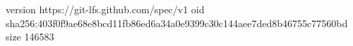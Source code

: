 version https://git-lfs.github.com/spec/v1
oid sha256:403f0f9ae68e8bcd11fb86ed6a34a0e9399c30c144aee7ded8b46755c77560bd
size 146583

